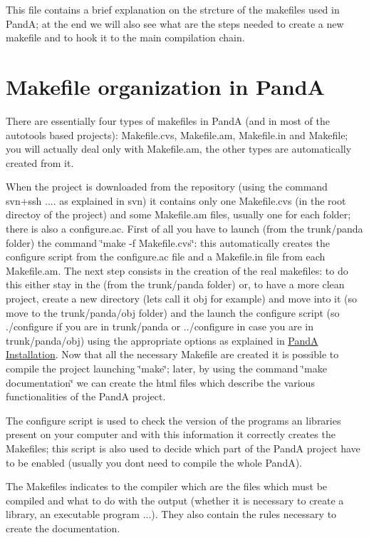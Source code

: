 This file contains a brief explanation on the strcture of the makefiles used in PandA; at the end we will also see what are the steps needed to create a new makefile and to hook it to the main compilation chain.\hypertarget{makefiles_how_to_panda_makefile_organization}{}\section{Makefile organization in PandA}\label{makefiles_how_to_panda_makefile_organization}
There are essentially four types of makefiles in PandA (and in most of the autotools based projects)\+: Makefile.\+cvs, Makefile.\+am, Makefile.\+in and Makefile; you will actually deal only with Makefile.\+am, the other types are automatically created from it.

When the project is downloaded from the repository (using the command svn+ssh .... as explained in svn) it contains only one Makefile.\+cvs (in the root directoy of the project) and some Makefile.\+am files, usually one for each folder; there is also a configure.\+ac. First of all you have to launch (from the trunk/panda folder) the command \char`\"{}make -\/f Makefile.\+cvs\char`\"{}\+: this automatically creates the configure script from the configure.\+ac file and a Makefile.\+in file from each Makefile.\+am. The next step consists in the creation of the real makefiles\+: to do this either stay in the (from the trunk/panda folder) or, to have a more clean project, create a new directory (let\textquotesingle{}s call it obj for example) and move into it (so move to the trunk/panda/obj folder) and the launch the configure script (so ./configure if you are in trunk/panda or ../configure in case you are in trunk/panda/obj) using the appropriate options as explained in \hyperlink{panda_install}{PandA Installation}. Now that all the necessary Makefile are created it is possible to compile the project launching \char`\"{}make\char`\"{}; later, by using the command \char`\"{}make documentation\char`\"{} we can create the html files which describe the various functionalities of the PandA project.
\begin{DoxyItemize}
\item The configure script is used to check the version of the programs an libraries present on your computer and with this information it correctly creates the Makefiles; this script is also used to decide which part of the PandA project have to be enabled (usually you don\textquotesingle{}t need to compile the whole PandA).
\item The Makefiles indicates to the compiler which are the files which must be compiled and what to do with the output (whether it is necessary to create a library, an executable program ...). They also contain the rules necessary to create the documentation.
\end{DoxyItemize}

